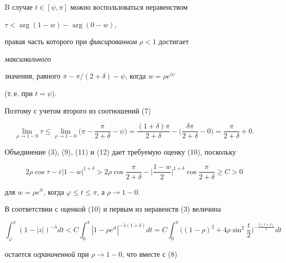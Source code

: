  


B случае $t\in[\psi,\pi]$ можно воспользоваться неравенством 


$\tau<\arg(1-w)-\arg(0-w)$, 


правая часть которого при {\it фиксированном} $\rho<1$ достигает 


{\it максимального} 


значения, равного $\pi-\pi/(2+\delta)-\psi$, когда $w=\rho e^{i\psi}$ 


(т.\,е. при $t=\psi$). 


Поэтому с учетом второго из соотношений (7) 


\begin{equation} 


\lim_{\rho\to1-0}\tau\le\lim_{\rho\to1-0} 


\bigg(\pi-\frac{\pi}{2+\delta}-\psi \bigg)= 


\frac{(1+\delta)\pi}{2+\delta}- 


\bigg(\frac{\delta\pi}{2+\delta}-0 \bigg)=\frac{\pi}{2+\delta}+0. 


\end{equation} 


 


Объединение (3), (9), (11) и (12) дает требуемую оценку (10), поскольку 


$$ 


2\rho\cos\tau-\varepsilon|1-w|^{1+\delta}> 


2\rho\cos\frac{\pi}{2+\delta}-\bigg|\frac{1-w}{2}\bigg|^{1+\delta} 


\cos\frac{\pi}{2+\delta}\ge C>0 


$$ 


для $w=\rho e^{it}$, когда $\varphi\le t\le\pi$, а $\rho\to1-0$. 


 


В соответствии с оценкой (10) и первым из неравенств (3) величина 


$$ 


\int^\pi_{\varphi}(1-|z|)^{-\lambda}d t<C\int^\pi_0 


|1-\rho e^{it}|^{-\lambda(1+\delta)}d t=C\int^\pi_0 


\bigg((1-\rho)^2+4\rho\sin^2\frac{t}{2} 


\bigg)^{-\frac{\lambda(1+\delta)}{2}}d t 


$$ 


остается {\it ограниченной} при $\rho\to1-0$, что вместе с (8) 


